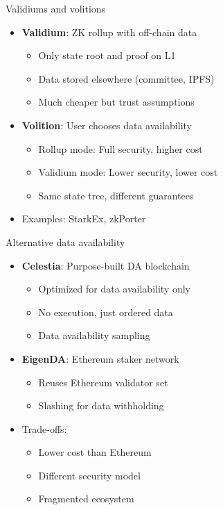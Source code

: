 \documentclass[aspectratio=169, lualatex, handout]{beamer}
\begin{document}
\begin{frame}{Validiums and volitions}
	\begin{itemize}
		\item \textbf{Validium}: ZK rollup with off-chain data
		      \begin{itemize}
			      \item Only state root and proof on L1
			      \item Data stored elsewhere (committee, IPFS)
			      \item Much cheaper but trust assumptions
		      \end{itemize}
		\item \textbf{Volition}: User chooses data availability
		      \begin{itemize}
			      \item Rollup mode: Full security, higher cost
			      \item Validium mode: Lower security, lower cost
			      \item Same state tree, different guarantees
		      \end{itemize}
		\item Examples: StarkEx, zkPorter
	\end{itemize}
\end{frame}

\begin{frame}{Alternative data availability}
	\begin{itemize}
		\item \textbf{Celestia}: Purpose-built DA blockchain
		      \begin{itemize}
			      \item Optimized for data availability only
			      \item No execution, just ordered data
			      \item Data availability sampling
		      \end{itemize}
		\item \textbf{EigenDA}: Ethereum staker network
		      \begin{itemize}
			      \item Reuses Ethereum validator set
			      \item Slashing for data withholding
		      \end{itemize}
		\item Trade-offs:
		      \begin{itemize}
			      \item Lower cost than Ethereum
			      \item Different security model
			      \item Fragmented ecosystem
		      \end{itemize}
	\end{itemize}
\end{frame}
\end{document}
